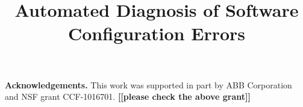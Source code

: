 \documentclass[conference]{IEEEtran}
\newcommand{\todo}[1]{{\color{red}\bfseries [[{#1}]]}}
\newcommand{\tinysqueeze}{\vspace{-1mm}}
\newcommand{\smallsqueeze}{\vspace{-1mm}}
\begin{document}
\normalem

\title{\huge Automated Diagnosis of Software Configuration Errors} 

\author{
}


\maketitle \sloppy

\setlength{\leftmargini}{.25\leftmargini}







\smallsqueeze



\smallsqueeze



\smallsqueeze



\tinysqueeze



\vspace{2mm}

\noindent \textbf{Acknowledgements.} This work was supported
in part by ABB Corporation and NSF grant CCF-1016701. \todo{please check the above grant}

\tinysqueeze
\tinysqueeze




\end{document}
